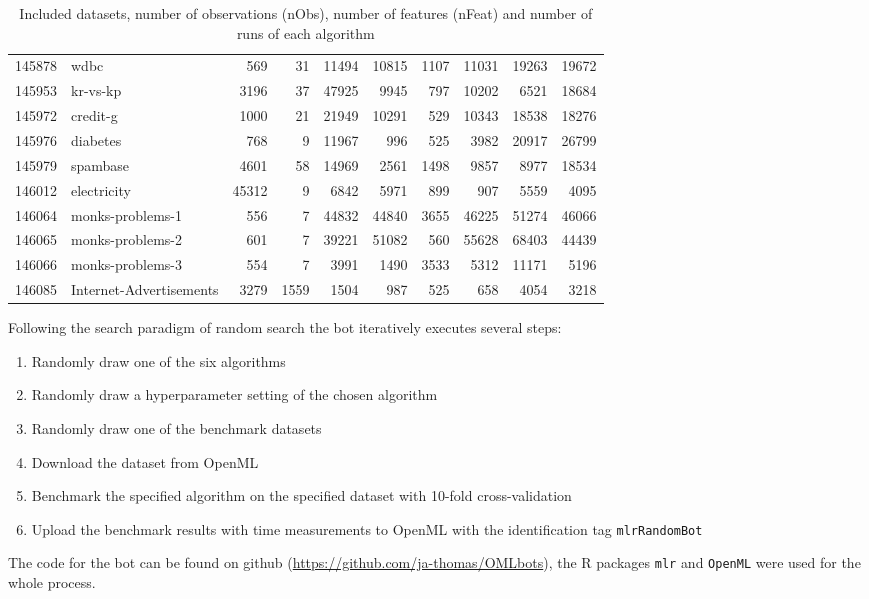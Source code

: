 \documentclass{article}
\begin{document}
\begin{table}[ht]
\begin{tabular}{rlrrrrrrrr}
  145878 & wdbc & 569 & 31 & 11494 & 10815 & 1107 & 11031 & 19263 & 19672 \\ 
  145953 & kr-vs-kp & 3196 & 37 & 47925 & 9945 & 797 & 10202 & 6521 & 18684 \\ 
  145972 & credit-g & 1000 & 21 & 21949 & 10291 & 529 & 10343 & 18538 & 18276 \\ 
  145976 & diabetes & 768 & 9 & 11967 & 996 & 525 & 3982 & 20917 & 26799 \\ 
  145979 & spambase & 4601 & 58 & 14969 & 2561 & 1498 & 9857 & 8977 & 18534 \\ 
  146012 & electricity & 45312 & 9 & 6842 & 5971 & 899 & 907 & 5559 & 4095 \\ 
  146064 & monks-problems-1 & 556 & 7 & 44832 & 44840 & 3655 & 46225 & 51274 & 46066 \\ 
  146065 & monks-problems-2 & 601 & 7 & 39221 & 51082 & 560 & 55628 & 68403 & 44439 \\ 
  146066 & monks-problems-3 & 554 & 7 & 3991 & 1490 & 3533 & 5312 & 11171 & 5196 \\ 
  146085 & Internet-Advertisements & 3279 & 1559 & 1504 & 987 & 525 & 658 & 4054 & 3218 \\ 
   \hline
\end{tabular}
\endgroup
\caption{Included datasets, number of observations (nObs), 
    number of features (nFeat) and number of runs of each algorithm} 
\label{tab:data}
\end{table}
Following the search paradigm of random search the bot iteratively executes several steps:
\begin{enumerate}
\item Randomly draw one of the six algorithms
\item Randomly draw a hyperparameter setting of the chosen algorithm
\item Randomly draw one of the benchmark datasets
\item Download the dataset from OpenML
\item Benchmark the specified algorithm on the specified dataset with 10-fold cross-validation
\item Upload the benchmark results with time measurements to OpenML with the 
identification tag \texttt{mlrRandomBot}
\end{enumerate}

The code for the bot can be found on github (\url{https://github.com/ja-thomas/OMLbots}), the R packages \texttt{mlr} \citep{Bischl2016} 
and \texttt{OpenML} \citep{Casalicchio2017} were used for the whole process. 
\end{document}
